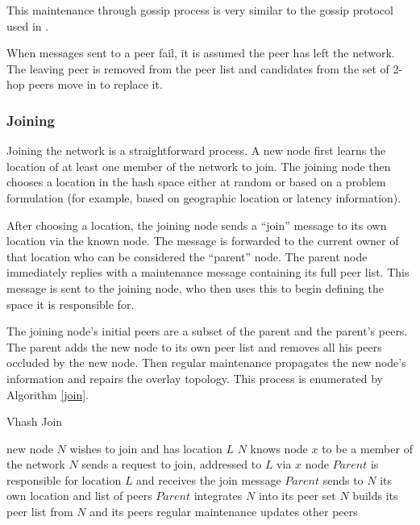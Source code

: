 \documentclass{IEEEtran}
\begin{document}
This maintenance through gossip process is very similar to the gossip protocol used in \cite{raynet}.  

When messages sent to a peer fail, it is assumed the peer has left the network. The leaving peer is removed from the peer list and candidates from the set of 2-hop peers move in to replace it.


\subsubsection*{Joining}
Joining the network is a straightforward process. A new node first learns the location of at least one member of the network to join. The joining node then chooses a location in the hash space either at random or based on a problem formulation (for example, based on geographic location or latency information).

After choosing a location, the joining node sends a ``join'' message to its own location via the known node.
The message is forwarded to the current owner of that location who can be considered the ``parent'' node.
The parent node immediately replies with a maintenance message containing its full peer list. This message is sent to the joining node, who then uses this to begin defining the space it is responsible for. 

The joining node's initial peers are a subset of the parent and the parent's peers. The parent adds the new node to its own peer list and removes all his peers occluded by the new node.  Then regular maintenance propagates the new node's information and repairs the overlay topology.  This process is enumerated by Algorithm \ref{join}.


\begin{algorithm}
\caption{Vhash Join}
\label{join}
\begin{algorithmic}[1]  %
\STATE new node $N$ wishes to join and has location $L$
\STATE $N$ knows node $x$ to be a member of the network
\STATE $N$ sends a request to join, addressed to $L$ via $x$
\STATE node $Parent$ is responsible for location $L$ and receives the join message
\STATE $Parent$ sends to $N$ its own location and list of peers
\STATE $Parent$ integrates $N$ into its peer set
\STATE $N$ builds its peer list from $N$ and its peers
\STATE regular maintenance updates other peers
\end{algorithmic}
\end{algorithm}
\end{document}
